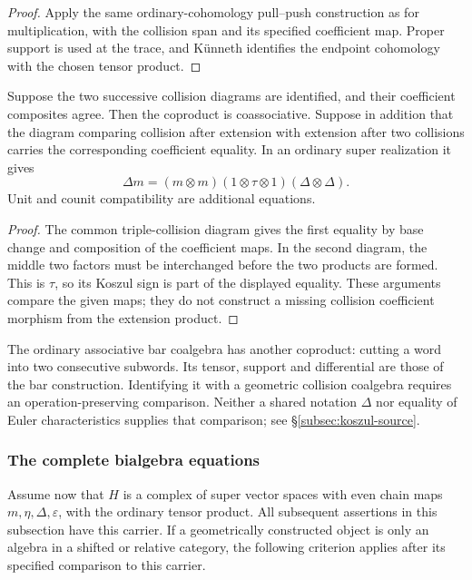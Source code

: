 \begin{proof}
Apply the same ordinary-cohomology pull--push construction as
for multiplication, with the collision span and its specified
coefficient map. Proper support is used at the trace, and
K\"unneth identifies the endpoint cohomology with the chosen
tensor product.
\end{proof}

\begin{proposition}
\label{prop:finite-hall-coproduct-coassociativity-two-step-flags}
\label{prop:finite-hall-bialgebra-compatibility}
Suppose the two successive collision diagrams are identified,
and their coefficient composites agree. Then the coproduct is
coassociative. Suppose in addition that the diagram comparing
collision after extension with extension after two collisions
carries the corresponding coefficient equality. In an ordinary
super realization it gives
\[
 \Delta m=(m\otimes m)(1\otimes\tau\otimes1)
                     (\Delta\otimes\Delta).
\]
Unit and counit compatibility are additional equations.
\end{proposition}

\begin{proof}
The common triple-collision diagram gives the first equality by
base change and composition of the coefficient maps. In the
second diagram, the middle two factors must be interchanged
before the two products are formed. This is $\tau$, so its
Koszul sign is part of the displayed equality. These arguments
compare the given maps; they do not construct a missing collision
coefficient morphism from the extension product.
\end{proof}

The ordinary associative bar coalgebra has another coproduct:
cutting a word into two consecutive subwords. Its tensor,
support and differential are those of the bar construction.
Identifying it with a geometric collision coalgebra requires an
operation-preserving comparison. Neither a shared notation
$\Delta$ nor equality of Euler characteristics supplies that
comparison; see \S\ref{subsec:koszul-source}.

\subsubsection*{The complete bialgebra equations}

Assume now that $H$ is a complex of super vector spaces with
even chain maps $m,\eta,\Delta,\varepsilon$, with the ordinary
tensor product. All subsequent assertions in this subsection
have this carrier. If a geometrically constructed object is only
an algebra in a shifted or relative category, the following
criterion applies after its specified comparison to this carrier.

